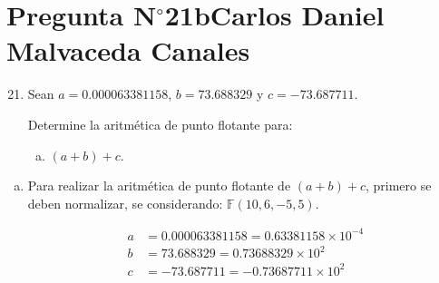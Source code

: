 \section{Pregunta N$^{\circ}$21b\qquad Carlos Daniel Malvaceda Canales}

\begin{frame}
	\begin{enumerate}\setcounter{enumi}{20}
		\item

		      Sean
		      \begin{math}
			      a=0.000063381158
		      \end{math},
		      \begin{math}
			      b=73.688329
		      \end{math}
		      y
		      \begin{math}
			      c=-73.687711
		      \end{math}.

		      Determine la aritmética de punto flotante para:

		      \begin{enumerate}[b)]
			      \item

			            \begin{math}
				            \left(a+b\right)+c
			            \end{math}.
		      \end{enumerate}
	\end{enumerate}

	\begin{solution}
		\begin{enumerate}[b)]
			\item
			      Para realizar la aritmética de punto flotante de
			      \begin{math}
				      \left(a+b\right)+c
			      \end{math},
			      primero se deben normalizar, se considerando:
			      \begin{math}
				      \mathbb{F}\left(10,6,-5,5\right)
			      \end{math}.

			      \begin{align*}
				      a & = 0.000063381158=0.63381158\times 10^{-4} \\
				      b & = 73.688329=0.73688329\times 10^{2}       \\
				      c & = -73.687711=-0.73687711\times 10^{2}
			      \end{align*}


\end{enumerate}
\end{solution}
\end{frame}

